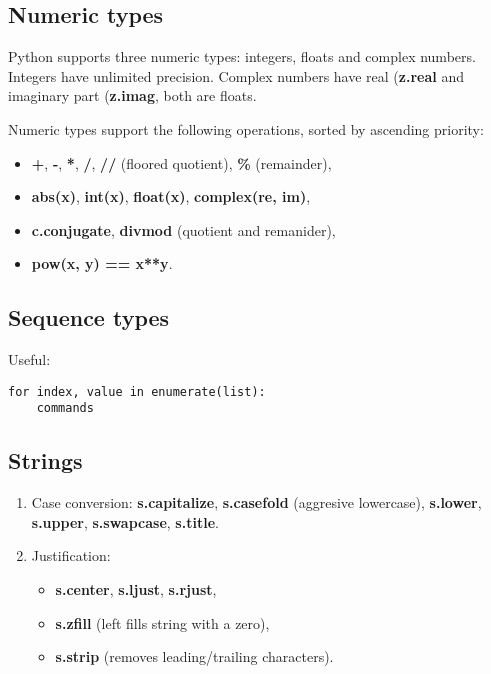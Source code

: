 \documentclass[a4paper, twoside, 8pt]{extarticle}
\newenvironment{enumx} {
	\begin{enumerate}[leftmargin=*]
	\setlength{\topsep}{0pt}
	\setlength{\itemsep}{0pt}
	\setlength{\parskip}{0pt}
	\setlength{\parsep}{0pt}
	}
{\end{enumerate}}
\newenvironment{itemx} {
	\begin{itemize}[leftmargin=*,noitemsep,topsep=0pt]
	}
{\end{itemize}}
\newcommand{\python}[1] {\textbf{\color{blue}#1}}
\begin{document}
\begin{multicols*}{3}
\subsection{Numeric types}
Python supports three numeric types: integers, floats and complex numbers.
Integers have unlimited precision.
Complex numbers have real (\python{z.real} and imaginary part (\python{z.imag},
both are floats.

Numeric types support the following operations, sorted by ascending priority:
\begin{itemx}
\item \python{+}, \python{-}, \python{*}, \python{/}, \python{//} (floored quotient), \python{\%} (remainder),
\item \python{abs(x)}, \python{int(x)}, \python{float(x)}, \python{complex(re, im)},
\item \python{c.conjugate}, \python{divmod} (quotient and remanider),
\item \python{pow(x, y) == x**y}.
\end{itemx}


\subsection{Sequence types}
Useful:
\begin{verbatim}
for index, value in enumerate(list):
    commands
\end{verbatim}

\subsection{Strings}
\begin{enumx}
\item Case conversion: 
\python{s.capitalize}, 
\python{s.casefold} (aggresive lowercase), 
\python{s.lower}, 
\python{s.upper}, 
\python{s.swapcase}, 
\python{s.title}.

\item Justification: 
\begin{itemx}
	\item \python{s.center},
		  \python{s.ljust},
	      \python{s.rjust},

	\item \python{s.zfill} 
	(left fills string with a zero),

	\item \python{s.strip} 
	(removes leading/trailing characters).
\end{itemx}


\end{enumx}
\end{multicols*}
\end{document}
